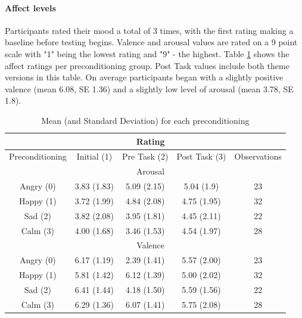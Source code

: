 	\paragraph{Affect levels} Participants rated their mood a total of 3 times, with the first rating making a baseline before testing begins. Valence and arousal values are rated on a 9 point scale with "1" being the lowest rating and "9" - the highest. Table \ref{tbl:distributionOfAffect} shows the affect ratings per preconditioning group. Post Task values include both theme versions in this table. On average participants began with a slightly positive valence (mean 6.08, SE 1.36) and a slightly low level of arousal (mean 3.78, SE 1.8).
	
	\begin{table}[h!]
	\begin{center}
				
		\begin{tabular}{|c|c|c|c|c|}
			\hline 
			& \multicolumn{3}{c|}{Rating} &  \\ 
			\hline 
			Preconditioning & Initial (1) & Pre Task (2) & Post Task (3) & Observations \\ 
			\hline 
			& \multicolumn{3}{|c|}{Arousal} &  \\ 
			\hline 
			Angry (0) & 3.83 (1.83) & 5.09 (2.15) & 5.04 (1.9) & 23 \\ 
			\hline 
			Happy (1) & 3.72 (1.99) & 4.84 (2.08) & 4.75 (1.95) & 32 \\ 
			\hline 
			Sad (2) & 3.82 (2.08) & 3.95 (1.81) & 4.45 (2.11) & 22 \\ 
			\hline 
			Calm (3) & 4.00 (1.68) & 3.46 (1.53) & 4.54 (1.97) & 28 \\ 
			\hline 
			& \multicolumn{3}{|c|}{Valence} &  \\ 
			\hline 
			Angry (0) & 6.17 (1.19) & 2.39 (1.41) & 5.57 (2.00) & 23 \\ 
			\hline 
			Happy (1) & 5.81 (1.42) & 6.12 (1.39) & 5.00 (2.02) & 32 \\ 
			\hline 
			Sad (2) & 6.41 (1.44) & 4.18 (1.50) & 5.59 (1.56) & 22 \\ 
			\hline 
			Calm (3) & 6.29 (1.36) & 6.07 (1.41) & 5.75 (2.08) & 28 \\ 
			\hline 
		\end{tabular}
	\end{center}
	\caption{Mean (and Standard Deviation) for each preconditioning}
	\label{tbl:distributionOfAffect}
	\end{table}

